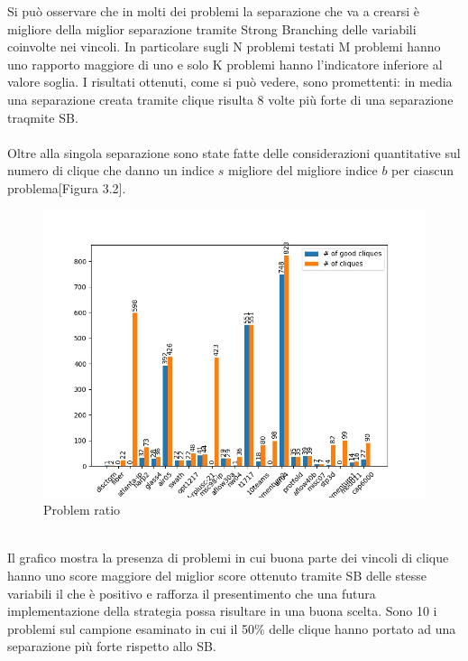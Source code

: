 \documentclass[12pt,a4paper,twoside,openright]{book}
\begin{document}
Si può osservare che in molti dei problemi la separazione che va a crearsi è migliore della miglior separazione 
tramite Strong Branching delle variabili coinvolte nei vincoli. In particolare sugli N problemi testati
M problemi hanno uno rapporto maggiore di uno e solo K problemi hanno l'indicatore inferiore al valore soglia.
I risultati ottenuti, come si può vedere, sono promettenti: in media una separazione creata tramite clique risulta
8 volte più forte di una separazione traqmite SB. \\\\
Oltre alla singola separazione sono state fatte delle considerazioni quantitative sul numero di clique che danno un 
indice $s$ migliore del migliore indice $b$ per ciascun problema[Figura 3.2].\pagebreak
\begin{figure}[ht]
    \centering
    \includegraphics [scale = 0.7]{chart_agg2}
    \caption{Problem ratio}
    \label{fig:ratio}
\end{figure}\\
Il grafico mostra la presenza di problemi in cui buona parte dei vincoli di clique hanno uno score maggiore del miglior
score ottenuto tramite SB delle stesse variabili il che è positivo e rafforza il presentimento che una futura implementazione
della strategia possa risultare in una buona scelta. Sono 10 i problemi sul campione esaminato in cui il 50\% delle clique
hanno portato ad una separazione più forte rispetto allo SB.
\end{document}
